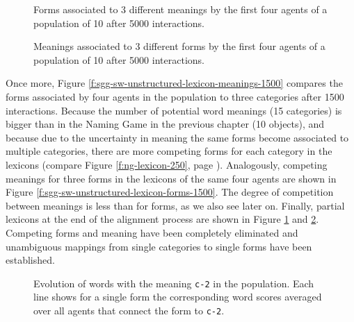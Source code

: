 \stopfiguregroup

\startfiguregroup

\begin{figure}[t]
  
  \caption{Forms associated to 3 different meanings by the first four
    agents of a population of 10 after 5000 interactions.}
  \label{f:sgg-sw-unstructured-lexicon-meanings-5000}
\end{figure}

\begin{figure}[t]
  
  \caption{Meanings associated to 3 different forms by the first four
    agents of a population of 10 after 5000 interactions.}
  \label{f:sgg-sw-unstructured-lexicon-forms-5000}
\end{figure}

\stopfiguregroup


Once more, Figure \ref{f:sgg-sw-unstructured-lexicon-meanings-1500}
compares the forms associated by four agents in the population to
three categories after 1500 interactions. Because the number of
potential word meanings (15 categories) is bigger than in the Naming
Game in the previous chapter (10 objects), and because due to the
uncertainty in meaning the same forms become associated to multiple
categories, there are more competing forms for each category in the
lexicons (compare Figure \ref{f:ng-lexicon-250}, page
\pageref{f:ng-lexicon-250}). Analogously, competing meanings for
three forms in the lexicons of the same four agents are shown in
Figure \ref{f:sgg-sw-unstructured-lexicon-forms-1500}. The degree
of competition between meanings is less than for forms, as we also see
later on. Finally, partial lexicons at the end of the alignment
process are shown in Figure
\ref{f:sgg-sw-unstructured-lexicon-meanings-5000} and
\ref{f:sgg-sw-unstructured-lexicon-forms-5000}. Competing forms and
meaning have been completely eliminated and unambiguous mappings from
single categories to single forms have been established.


\startfiguregroup

\begin{figure}[t]
  \caption{Evolution of words with the meaning \texttt{c-2} in the
    population. Each line shows for a single form the corresponding
    word scores averaged over all agents that connect the form to
    \texttt{c-2}. }
  \label{f:sgg-sw-unstructured-word-form-scores-c-2}
\end{figure}

